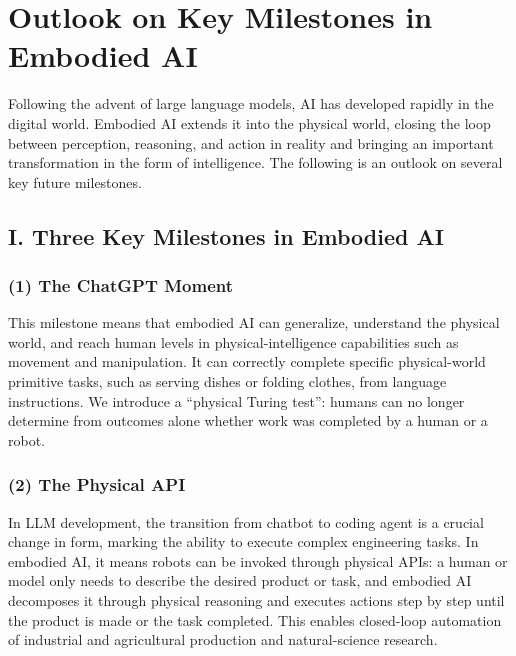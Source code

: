 \setcounter{section}{0}

\hypertarget{outlook-on-key-milestones-in-embodied-ai}{%
\section{Outlook on Key Milestones in Embodied AI}\label{outlook-on-key-milestones-in-embodied-ai}}

Following the advent of large language models, AI has developed rapidly in the digital world. Embodied AI extends it into the physical world, closing the loop between perception, reasoning, and action in reality and bringing an important transformation in the form of intelligence. The following is an outlook on several key future milestones.

\hypertarget{i.-three-key-milestones-in-embodied-ai}{%
\subsection{I. Three Key Milestones in Embodied AI}\label{i.-three-key-milestones-in-embodied-ai}}

\hypertarget{the-chatgpt-moment}{%
\subsubsection{(1) The ChatGPT Moment}\label{the-chatgpt-moment}}

This milestone means that embodied AI can generalize, understand the physical world, and reach human levels in physical-intelligence capabilities such as movement and manipulation. It can correctly complete specific physical-world primitive tasks, such as serving dishes or folding clothes, from language instructions. We introduce a ``physical Turing test'': humans can no longer determine from outcomes alone whether work was completed by a human or a robot.

\hypertarget{the-physical-api}{%
\subsubsection{(2) The Physical API}\label{the-physical-api}}

In LLM development, the transition from chatbot to coding agent is a crucial change in form, marking the ability to execute complex engineering tasks. In embodied AI, it means robots can be invoked through physical APIs: a human or model only needs to describe the desired product or task, and embodied AI decomposes it through physical reasoning and executes actions step by step until the product is made or the task completed. This enables closed-loop automation of industrial and agricultural production and natural-science research.

